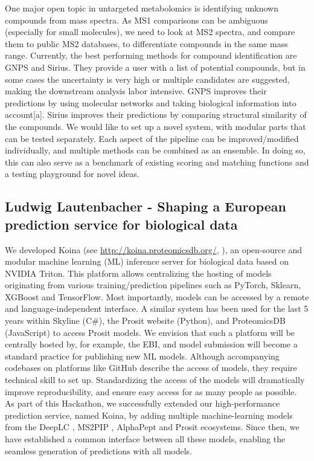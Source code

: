 One major open topic in untargeted metabolomics is identifying unknown compounds from mass spectra. As MS1 comparisons can be ambiguous (especially for small molecules), we need to look at MS2 spectra, and compare them to public MS2 databases, to differentiate compounds in the same mass range. Currently, the best performing methods for compound identification are GNPS and Sirius. They provide a user with a list of potential compounds, but in some cases the uncertainty is very high or multiple candidates are suggested, making the downstream analysis labor intensive. GNPS improves their predictions by using molecular networks and taking biological information into account[a]. Sirius improves their predictions by comparing structural similarity of the compounds. We would like to set up a novel system, with modular parts that can be tested separately. Each aspect of the pipeline can be improved/modified individually, and multiple methods can be combined as an ensemble. In doing so, this can also serve as a benchmark of existing scoring and matching functions and a testing playground for novel ideas.\\

\subsection{Ludwig Lautenbacher - Shaping a European prediction service for biological data}

We developed Koina (see \url{http://koina.proteomicsdb.org/}, \citep{Lautenbacher2024}), an open-source and modular machine learning (ML) inference server for biological data based on NVIDIA Triton. This platform allows centralizing the hosting of models originating from various training/prediction pipelines such as PyTorch, Sklearn, XGBoost and TensorFlow. Most importantly, models can be accessed by a remote and language-independent interface. A similar system has been used for the last 5 years within Skyline (C\#), the Prosit website (Python), and ProteomicsDB (JavaScript) to access Prosit models. We envision that such a platform will be centrally hosted by, for example, the EBI, and model submission will become a standard practice for publishing new ML models. Although accompanying codebases on platforms like GitHub describe the access of models, they require technical skill to set up. Standardizing the access of the models will dramatically improve reproducibility, and ensure easy access for as many people as possible.
As part of this Hackathon, we successfully extended our high-performance prediction service, named Koina, by adding multiple machine-learning models from the DeepLC \citep{pmid34711972}, MS2PIP \citep{pmid24078703, pmid25990723}, AlphaPept \citep{pmid36433986} and Prosit \citep{pmid31133760, pmid35549156, pmid34099720} ecosystems. Since then, we have established a common interface between all these models, enabling the seamless generation of predictions with all models.\\


